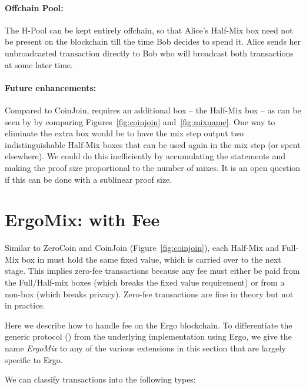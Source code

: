 \documentclass[11pt]{article}
\newcommand{\mixname}{ErgoMix\xspace}
\begin{document}
\paragraph{Offchain Pool:} The H-Pool can be kept entirely offchain, so that Alice's Half-Mix box need not be present on the blockchain till the time Bob decides to spend it. Alice sends her unbroadcasted transaction directly to Bob who will broadcast both transactions at some later time. 


\paragraph{Future enhancements:} Compared to CoinJoin, \algname requires an additional box -- the Half-Mix box -- as can be seen by by comparing Figures~\ref{fig:coinjoin} and~\ref{fig:mixname}. One way to eliminate the extra box would be to have the mix step output two indistinguishable Half-Mix boxes that can be used again in the mix step (or spent elsewhere). We could do this inefficiently by accumulating the statements and making the proof size proportional to the number of mixes. It is an open question if this can be done with a sublinear proof size.

\section{\mixname: \algname with Fee}
\label{fee}

Similar to ZeroCoin and CoinJoin (Figure~\ref{fig:coinjoin}), each Half-Mix and Full-Mix box in \algname must hold the same fixed value, which is carried over to the next stage. This implies zero-fee transactions because any fee must either be paid from the Full/Half-mix boxes (which breaks the fixed value requirement) or from a non-\algname box (which breaks privacy). Zero-fee transactions are fine in theory but not in practice. %

Here we describe how to handle fee on the Ergo blockchain. To differentiate the generic protocol (\algname) from the underlying implementation using Ergo, we give the name {\em \mixname} to any of the various extensions in this section that are largely specific to Ergo. 

We can classify \algname transactions into the following types:
\end{document}
